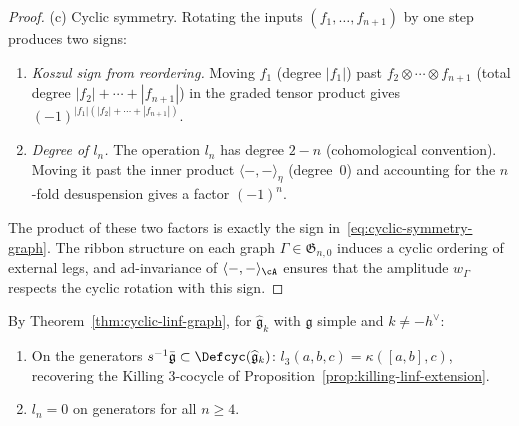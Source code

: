 \begin{proof}
(c)\enspace
Cyclic symmetry.  Rotating the inputs $(f_1, \ldots, f_{n+1})$
by one step produces two signs:
\begin{enumerate}
\item \emph{Koszul sign from reordering.}  Moving
  $f_1$ (degree $|f_1|$) past
  $f_2 \otimes \cdots \otimes f_{n+1}$
  (total degree $|f_2| + \cdots + |f_{n+1}|$) in the
  graded tensor product gives $(-1)^{|f_1|(|f_2|+\cdots+|f_{n+1}|)}$.
\item \emph{Degree of $l_n$.}  The operation $l_n$ has degree
  $2 - n$ (cohomological convention).  Moving it past the inner
  product $\langle{-},{-}\rangle_\eta$ (degree~$0$) and
  accounting for the $n$-fold desuspension gives a factor
  $(-1)^n$.
\end{enumerate}
The product of these two factors is exactly the sign
in~\eqref{eq:cyclic-symmetry-graph}.  The ribbon structure
on each graph $\Gamma \in \mathfrak{G}_{n,0}$ induces a cyclic
ordering of external legs, and $\mathrm{ad}$-invariance of
$\langle{-},{-}\rangle_\cA$ ensures that the amplitude
$w_\Gamma$ respects the cyclic rotation with this sign.
\end{proof}

\begin{corollary}\label{cor:killing-recovery-graph}
By Theorem~\textup{\ref{thm:cyclic-linf-graph}},
for $\widehat{\mathfrak{g}}_k$ with $\mathfrak{g}$ simple and
$k \neq -h^\vee$:
\begin{enumerate}[label=\textup{(\roman*)}]
\item On the generators
  $s^{-1}\bar{\mathfrak{g}} \subset \Defcyc(\widehat{\mathfrak{g}}_k)$:
  $l_3(a,b,c) = \kappa([a,b],c)$, recovering the Killing $3$-cocycle of
  Proposition~\textup{\ref{prop:killing-linf-extension}}.
\item $l_n = 0$ on generators for all $n \geq 4$.
\end{enumerate}
\end{corollary}

